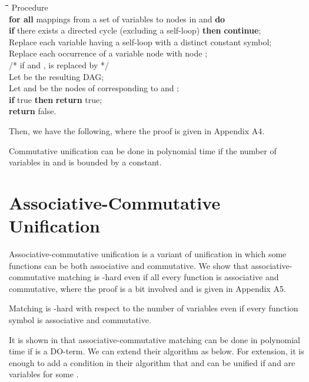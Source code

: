\documentclass[a4paper]{llncs}
\begin{document}
\begin{rm}
\begin{tabbing}
\quad \= \quad \= \quad \= \quad \= \quad \= \quad \= \quad \= \kill
\> Procedure \\
\> \> {\bf for all} mappings  from a set of variables to nodes in  and  {\bf do} \\
\> \> \> {\bf if} there exists a directed cycle (excluding a self-loop) {\bf then} {\bf continue};\\
\> \> \> Replace each variable having a self-loop with a distinct constant symbol;\\
\> \> \> Replace each occurrence of a variable node  with node ;\\
\> \> \> \> \> \> /* if   and ,  is replaced by  */\\ 
\> \> \> Let  be the resulting DAG;\\
\> \> \> Let  and  be the nodes of  corresponding to  and ;\\
\> \> \> {\bf if} true {\bf then} {\bf return} true;\\
\> \> {\bf return} false.
\end{tabbing}
\end{rm}

\noindent
Then, we have the following, where the proof is given in Appendix A4.

\begin{theorem}
Commutative unification can be done in polynomial time
if the number of variables in  and  is 
bounded by a constant.
\label{thm:com-unif-poly}
\end{theorem}

\section{Associative-Commutative Unification}

Associative-commutative unification is a variant of unification
in which some functions can be both associative and commutative.
We show that associative-commutative matching is
-hard even if all every function is associative and commutative,
where the proof is a bit involved and is given in Appendix A5.

\begin{theorem}
Matching is -hard with respect to the number of variables
even if every function symbol is associative and commutative.
\label{thm:ac-hard}
\end{theorem}

It is shown in \cite{benanav87} that associative-commutative matching
can be done in polynomial time if  is a DO-term.
We can extend their algorithm as below.
For extension, it is enough to add a condition in their algorithm that
 and
 can be unified
if  and  are variables for some .
\end{document}
